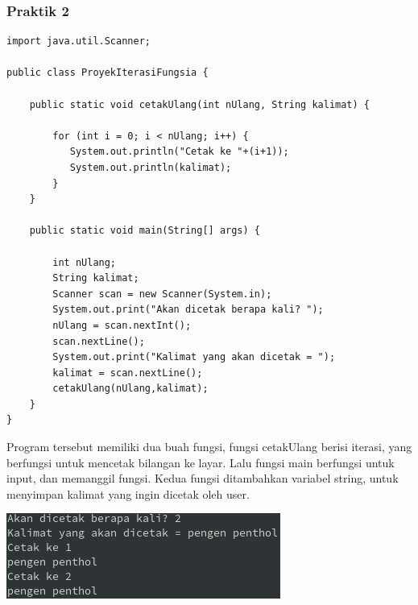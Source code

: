 \documentclass[a4paper,12pt]{article}
\begin{document}
\subsubsection{Praktik 2}
\begin{lstlisting}
import java.util.Scanner;

public class ProyekIterasiFungsia {

    public static void cetakUlang(int nUlang, String kalimat) {
       
        for (int i = 0; i < nUlang; i++) {
           System.out.println("Cetak ke "+(i+1)); 
           System.out.println(kalimat);
        }
    }

    public static void main(String[] args) {

        int nUlang;
        String kalimat;
        Scanner scan = new Scanner(System.in);
        System.out.print("Akan dicetak berapa kali? ");
        nUlang = scan.nextInt();
        scan.nextLine();
        System.out.print("Kalimat yang akan dicetak = ");
        kalimat = scan.nextLine();
        cetakUlang(nUlang,kalimat);
    }
}
\end{lstlisting}
Program tersebut memiliki dua buah fungsi, fungsi cetakUlang berisi iterasi, yang berfungsi untuk mencetak bilangan ke
layar. Lalu fungsi main berfungsi untuk input, dan memanggil fungsi. Kedua fungsi ditambahkan variabel string, untuk
menyimpan kalimat yang ingin dicetak oleh user.

\begin{center}
    \includegraphics[scale=1]{2.png} 
\end{center}
\end{document}
